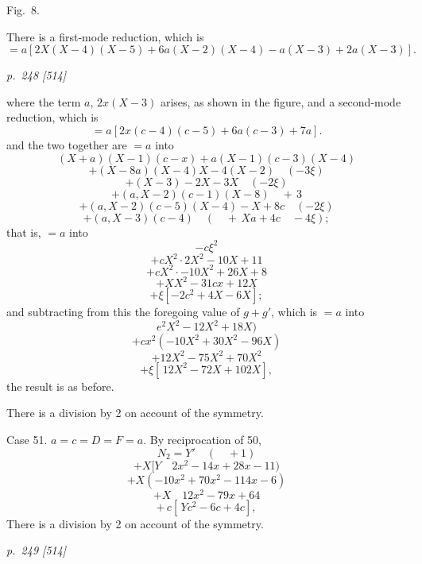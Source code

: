 \documentclass[11pt,a4paper]{article}
\theoremstyle{plain}
\theoremstyle{definition}
\begin{document}
\begin{center}
Fig.\ 8.\\
\end{center}

There is a first-mode reduction, which is
\[
= a [2X(X - 4)(X - 5) + 6a(X - 2)(X - 4) - a(X - 3) + 2a(X - 3)].
\]

\clearpage

\bigskip
\textit{p.~248 [514]}
\smallskip

\noindent
where the term $a$, $2x(X - 3)$ arises, as shown in the figure, and a second-mode reduction,
which is
\[
= a [2x(c - 4)(c - 5) + 6a(c - 3) + 7a].
\]
and the two together are $= a$ into
\[
(X + a)(X - 1)(c - x) + a(X - 1)(c - 3)(X - 4)
\]
\[
+ (X - 8a)(X - 4)X - 4(X - 2) \quad (-3\xi)
\]
\[
+ (X - 3) - 2X - 3X \quad (-2\xi)
\]
\[
+ (a, X - 2)(c - 1)(X - 8) \quad + \,3
\]
\[
+ (a, X - 2)(c - 5)(X - 4) - X + 8c \quad (-2\xi)
\]
\[
+ (a, X - 3)(c - 4) \quad (\quad + \,Xa + 4c \quad - 4\xi);
\]
that is, $= a$ into
\[
- c\xi^2
\]
\[
+ c X^2 \cdot 2X^2 - 10X + 11
\]
\[
+ c X^2 \cdot -10X^2 + 26X + 8
\]
\[
+ X X^2 - 31cx + 12X
\]
\[
+ \xi [-2c^2 + 4X - 6X];
\]
and subtracting from this the foregoing value of $g + g'$, which is $= a$ into
\[
e^2 X^2 - 12X^2 + 18X)
\]
\[
+ c x^2 (-10X^2 + 30X^2 - 96X)
\]
\[
+ 12X^2 - 75X^2 + 70X^2
\]
\[
+ \xi [\,12X^2 - 72X + 102X],
\]
the result is as before.

There is a division by 2 on account of the symmetry.

Case 51.  $a = c = D = F = a$.  By reciprocation of 50,
\[
N_2 = Y' \quad (\quad +1)
\]
\[
+ X[Y \quad 2x^2 - 14x + 28x - 11)
\]
\[
+ X(-10x^2 + 70x^2 - 114x - 6)
\]
\[
+ X \quad 12x^2 - 79x + 64
\]
\[
+ \,c[\,Yc^2 - 6c + 4c],
\]
There is a division by 2 on account of the symmetry.

\clearpage

\bigskip
\textit{p.~249 [514]}
\smallskip
\end{document}
